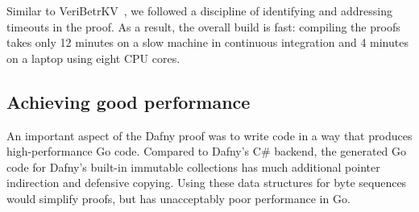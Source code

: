 

\begin{comment}
begin
    gsed -n '/method[^(]* [A-Z]*(/,/^\s*{/p' src/fs/dir_fs.dfy
    cat src/fs/nfs.s.dfy
end | wc -l
\end{comment}
%


Similar to VeriBetrKV~\cite{hance:veribetrkv}, we followed a
discipline of identifying and addressing timeouts in the proof.
As a result, the overall
build is fast: compiling the proofs takes only 12 minutes on a slow
machine in continuous integration and 4 minutes on a laptop
using eight CPU cores.




\subsection{Achieving good performance}


An important aspect of the Dafny proof was to write code in a way that produces
high-performance Go code.
Compared to Dafny's C\# backend, the generated Go code for Dafny's built-in
immutable collections has much
additional pointer indirection and defensive copying. Using these data
structures for byte sequences would simplify proofs, but has unacceptably poor
performance in Go.

